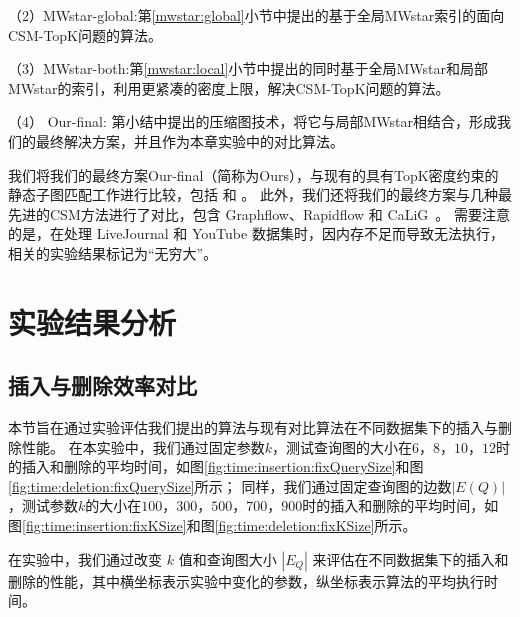 （2）MWstar-global:第\ref{mwstar:global}小节中提出的基于全局MWstar索引的面向CSM-TopK问题的算法。

（3）MWstar-both:第\ref{mwstar:local}小节中提出的同时基于全局MWstar和局部MWstar的索引，利用更紧凑的密度上限，解决CSM-TopK问题的算法。

（4） Our-final: 第\label{mwstar:compact-graph}小结中提出的压缩图技术，将它与局部MWstar相结合，形成我们的最终解决方案，并且作为本章实验中的对比算法。

我们将我们的最终方案Our-final（简称为Ours），与现有的具有TopK密度约束的静态子图匹配工作进行比较，包括 \itk\cite{static-topk-Gupta-DBLP:conf/icde/GuptaGYCH14} 和 \pm\cite{static-topk-Chen-DBLP:journals/ijprai/ChenLCTL18}。
此外，我们还将我们的最终方案与几种最先进的CSM方法进行了对比，包含 Graphflow\cite{csm-graphflow-DBLP:conf/sigmod/KankanamgeSMCS17}、Rapidflow\cite{csm-rapidflow-DBLP:journals/pvldb/SunSHL22} 和 CaLiG~\cite{csm-calig-DBLP:journals/pacmmod/YangZZY23}。
需要注意的是，\itk 在处理 LiveJournal 和 YouTube 数据集时，因内存不足而导致无法执行，相关的实验结果标记为“无穷大”。

\section{实验结果分析}
\label{ch5:overall-compare}
\subsection{插入与删除效率对比}
\label{ch5:insertion-deletion}
本节旨在通过实验评估我们提出的算法与现有对比算法在不同数据集下的插入与删除性能。
在本实验中，我们通过固定参数$k$，测试查询图的大小在$6$，$8$，$10$，$12$时的插入和删除的平均时间，如图\ref{fig:time:insertion:fixQuerySize}和图\ref{fig:time:deletion:fixQuerySize}所示；
同样，我们通过固定查询图的边数$|E(Q)|$，测试参数$k$的大小在$100$，$300$，$500$，$700$，$900$时的插入和删除的平均时间，如图\ref{fig:time:insertion:fixKSize}和图\ref{fig:time:deletion:fixKSize}所示。






在实验中，我们通过改变 $k$ 值和查询图大小 $|E_Q|$ 来评估在不同数据集下的插入和删除的性能，其中横坐标表示实验中变化的参数，纵坐标表示算法的平均执行时间。


